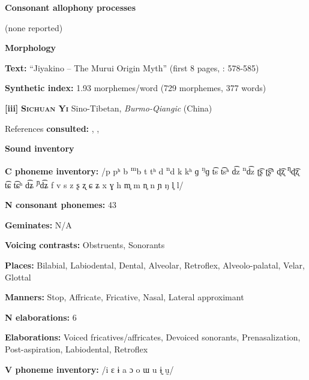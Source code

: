 \textbf{Consonant allophony processes}



(none reported)



\textbf{Morphology}



\textbf{Text:} “Jiyakino -- The Murui Origin Myth” (first 8 pages, \citealt{Wojtylak2017}: 578-585)



\textbf{Synthetic index:} 1.93 morphemes/word (729 morphemes, 377 words)



\textbf{[iii]}   \textbf{\textsc{Sichuan Yi}}  Sino-Tibetan, \textit{Burmo-Qiangic} (China)



References \textbf{consulted:} \citet{Gerner2013}, \citet{Maoji1997}, \citet{Merrifield2012}



\textbf{Sound inventory}



\textbf{C phoneme inventory:} /p pʰ b \textsuperscript{m}b t tʰ d \textsuperscript{n}d k kʰ ɡ \textsuperscript{ŋ}ɡ t͡s t͡sʰ d͡z \textsuperscript{n}d͡z ʈ͡ʂ ʈ͡ʂʰ ɖ͡ʐ \textsuperscript{ɳ}ɖ͡ʐ t͡ɕ t͡ɕʰ d͡ʑ \textsuperscript{ɲ}d͡ʑ f v s z ʂ ʐ ɕ ʑ x ɣ h m̥ m n̥ n ɲ ŋ l̥ l/



\textbf{N consonant phonemes:} 43



\textbf{Geminates:} N/A



\textbf{Voicing contrasts:} Obstruents, Sonorants



\textbf{Places:} Bilabial, Labiodental, Dental, Alveolar, Retroflex, Alveolo-palatal, Velar, Glottal



\textbf{Manners:} Stop, Affricate, Fricative, Nasal, Lateral approximant



\textbf{N elaborations:} 6



\textbf{Elaborations:} Voiced fricatives/affricates, Devoiced sonorants, Prenasalization, Post-aspiration, Labiodental, Retroflex



\textbf{V phoneme inventory:} /i ɛ ɨ a ɔ o ɯ u ɨ̰ ṵ/



